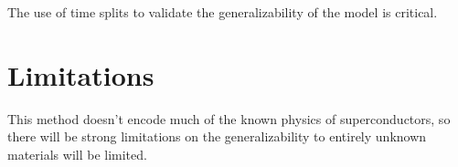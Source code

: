 \documentclass[book.tex]{subfiles}
\begin{document}


The use of time splits to validate the generalizability of the model is critical. %




\section{Limitations}

This method doesn't encode much of the known physics of superconductors, so there will be strong limitations on the generalizability to entirely unknown materials will be limited.
\end{document}
